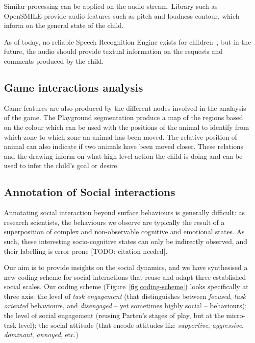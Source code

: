 \documentclass[sigconf]{acmart}
\begin{document}
Similar processing can be applied on the audio stream. Library such as OpenSMILE
provide audio features such as pitch and loudness contour, which inform on the
general state of the child.

As of today, no reliable Speech Recognition Engine exists for
children~\cite{kennedy2017child}, but in the future, the audio should provide
textual information on the requests and comments produced by the child.

\subsection{Game interactions analysis}

Game features are also produced by the different nodes involved in the analaysis
of the game. The Playground segmentation produce a map of the regions based on
the colour which can be used with the positions of the animal to identify from
which zone to which zone an animal has been moved. The relative position of
animal can also indicate if two animals have been moved closer. These relations
and the drawing inform on what high level action the child is doing and can be
used to infer the child's goal or desire.

\subsection{Annotation of Social interactions}
\label{sec|coding-scheme}

Annotating social interaction beyond surface behaviours is generally difficult:
as research scientists, the behaviours we observe are typically the result of a
superposition of complex and non-observable cognitive and emotional states. As
such, these interesting socio-cognitive states can only be indirectly observed,
and their labelling is error prone [TODO: citation needed].

Our aim is to provide insights on the social dynamics, and we have synthesised a
new coding scheme for social interactions that reuse and adapt three established
social scales. Our coding scheme (Figure~\ref{fig|coding-scheme}) looks specifically
at three axis: the level of \emph{task engagement} (that distinguishes between
\emph{focused}, \emph{task oriented} behaviours, and \emph{disengaged} -- yet
sometimes highly social -- behaviours); the level of social engagement (reusing
Parten's stages of play, but at the micro-task level); the social attitude (that
encode attitudes like \emph{supportive}, \emph{aggressive}, \emph{dominant},
\emph{annoyed}, etc.)
\end{document}
